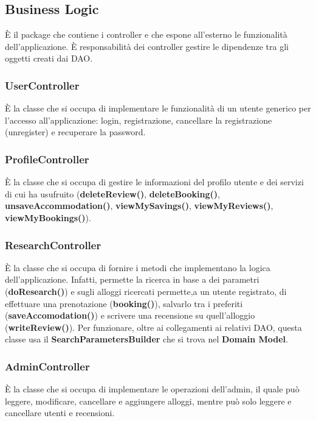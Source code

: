 \documentclass[10pt]{article}
\begin{document}
\subsection{Business Logic}

\`E il package che contiene i controller e che espone all'esterno le funzionalità dell'applicazione. \`E responsabilità dei controller gestire le dipendenze tra gli oggetti creati dai DAO.

\subsubsection{UserController}

\`E la classe che si occupa di implementare le funzionalità di un utente generico per l'accesso all'applicazione: login, registrazione, cancellare la registrazione (unregister) e recuperare la password.

\subsubsection{ProfileController}

\`E la classe che si occupa di gestire le informazioni del profilo utente e dei servizi di cui ha usufruito (\textbf{deleteReview()}, \textbf{deleteBooking()}, \textbf{unsaveAccommodation()}, \textbf{viewMySavings()}, \textbf{viewMyReviews()}, \textbf{viewMyBookings()}).

\subsubsection{ResearchController}

\`E la classe che si occupa di fornire i metodi che implementano la logica dell'applicazione. Infatti, permette la ricerca in base a dei parametri (\textbf{doResearch()}) e sugli alloggi ricercati permette,a un utente registrato, di effettuare una prenotazione (\textbf{booking()}), salvarlo tra i preferiti (\textbf{saveAccomodation()}) e scrivere una recensione su quell'alloggio (\textbf{writeReview()}). Per funzionare, oltre ai collegamenti ai relativi DAO, questa classe usa il \textbf{SearchParametersBuilder} che si trova nel \textbf{Domain Model}.

\subsubsection{AdminController}

\`E la classe che si occupa di implementare le operazioni dell'admin, il quale può  leggere, modificare, cancellare e aggiungere alloggi, mentre può solo leggere e cancellare utenti e recensioni.
 
\end{document}
